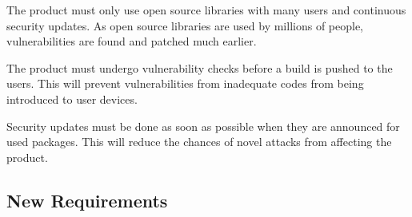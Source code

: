 \documentclass{article}
\begin{document}
The product must only use open source libraries with many users and continuous security updates. 
As open source libraries are used by millions of people, vulnerabilities are found and patched much earlier.

The product must undergo vulnerability checks before a build is pushed to the users.
This will prevent vulnerabilities from inadequate codes from being introduced to user devices.

Security updates must be done as soon as possible when they are announced for used packages.
This will reduce the chances of novel attacks from affecting the product.

\subsection{New Requirements}
\end{document}

